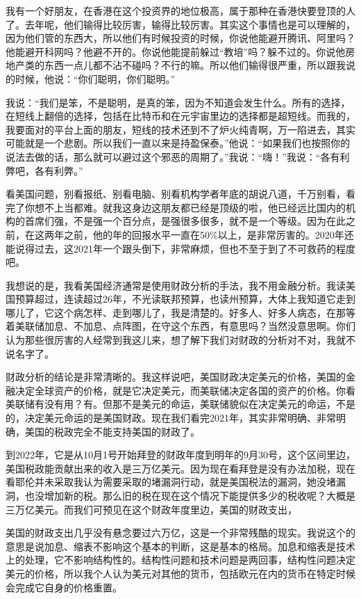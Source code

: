 \documentclass[UTF8, 12pt, a4paper]{ctexrep}
\begin{document}
我有一个好朋友，在香港在这个投资界的地位极高，属于那种在香港快要登顶的人了。去年呢，他们输得比较厉害，输得比较厉害。其实这个事情也是可以理解的，因为他们管的东西大，所以他们有时候投资的时候，你说他能避开腾讯、阿里吗？他能避开科网吗？他避不开的。你说他能提前躲过“教培”吗？躲不过的。你说他房地产类的东西一点儿都不沾不碰吗？不行的嘛。所以他们输得很严重，所以跟我说的时候，他说：“你们聪明，你们聪明。”

我说：“我们是笨，不是聪明，是真的笨，因为不知道会发生什么。所有的选择，在短线上翻倍的选择，包括在比特币和在元宇宙里边的选择都是超短线。而我的，我要面对的平台上面的朋友，短线的技术还到不了炉火纯青啊，万一陷进去，其实可能就是一个悲剧。所以我们一直以来是持盈保泰。”他说：“如果我们也按照你的说法去做的话，那么就可以避过这个邪恶的周期了。”我说：“嗨！”我说：“各有利弊吧，各有利弊。”

看美国问题，别看报纸、别看电脑、别看机构学者年底的胡说八道，千万别看，看完了你想不上当都难。就我这身边这朋友都已经是顶级的啦，他已经远比国内的机构的首席们强，不是强一个百分点，是强很多很多，就不是一个等级。因为在此之前，在这两年之前，他的年的回报水平一直在50\%以上，是非常厉害的。2020年还能说得过去，这2021年一个跟头倒下，非常麻烦，但也不至于到了不可救药的程度吧。

我想说的是，我看美国经济通常是使用财政分析的手法，我不用金融分析。我读美国预算超过，连读超过26年，不光读联邦预算，也读州预算，大体上我知道它走到哪儿了，它这个病怎样、走到哪儿了，我是清楚的。好多人、好多人病态，在那等着美联储加息、不加息、点阵图，在守这个东西，有意思吗？当然没意思啊。你们认为那些很厉害的人经常到我这儿来，想了解下我们对财政的分析对不对，我就不说名字了。

财政分析的结论是非常清晰的。我这样说吧，美国财政决定美元的价格，美国的金融决定全球资产的价格，就是它决定美元，而美联储决定各国的资产的价格。你看美联储有没有用？有。但那不是美元的命运，美联储貌似在决定美元的命运，不是的，决定美元命运的是美国财政。现在我们看完2021年，其实非常明确、非常明确，美国的税政完全不能支持美国的财政了。

到2022年，它是从10月1号开始拜登的财政年度到明年的9月30号，这个区间里边，美国税政能贡献出来的收入是三万亿美元。因为现在看拜登是没有办法加税，现在看耶伦并未采取我认为需要采取的堵漏洞行动，就是美国税法的漏洞，她没堵漏洞，也没增加新的税。那么旧的税在现在这个情况下能提供多少的税收呢？大概是三万亿美元。而我们可预见在这个财政年度里边，美国的财政支出，

美国的财政支出几乎没有悬念要过六万亿，这是一个非常残酷的现实。我说这个的意思是说加息、缩表不影响这个基本的判断，这是基本的格局。加息和缩表是技术上的处理，它不影响结构性的。结构性问题和技术问题是两回事，结构性问题决定美元的价格，所以我个人认为美元对其他的货币，包括欧元在内的货币在特定时候会完成它自身的价格重置。
\end{document}
